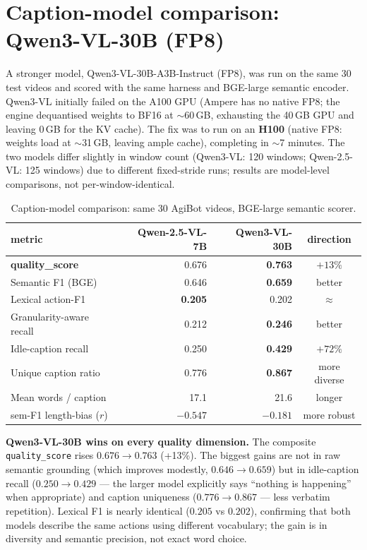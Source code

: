 \documentclass[10pt,letterpaper]{article}
\begin{document}
\section{Caption-model comparison: Qwen3-VL-30B (FP8)}\label{sec:qwen3}

A stronger model, Qwen3-VL-30B-A3B-Instruct (FP8), was run on the same 30 test videos and scored
with the same harness and BGE-large semantic encoder. Qwen3-VL initially failed on the A100 GPU
(Ampere has no native FP8; the engine dequantised weights to BF16 at $\sim$60\,GB, exhausting the
40\,GB GPU and leaving 0\,GB for the KV cache). The fix was to run on an \textbf{H100} (native
FP8: weights load at $\sim$31\,GB, leaving ample cache), completing in $\sim$7 minutes. The
two models differ slightly in window count (Qwen3-VL: 120 windows; Qwen-2.5-VL: 125 windows) due
to different fixed-stride runs; results are model-level comparisons, not per-window-identical.

\begin{table}[H]
\centering
\caption{Caption-model comparison: same 30 AgiBot videos, BGE-large semantic scorer.}
\begin{tabular}{lrr c}
\toprule
metric & Qwen-2.5-VL-7B & Qwen3-VL-30B & direction \\
\midrule
\textbf{quality\_score}       & 0.676 & \textbf{0.763} & $+13\%$ \\
Semantic F1 (BGE)             & 0.646 & \textbf{0.659} & better \\
Lexical action-F1             & \textbf{0.205} & 0.202 & $\approx$ \\
Granularity-aware recall      & 0.212 & \textbf{0.246} & better \\
Idle-caption recall           & 0.250 & \textbf{0.429} & $+72\%$ \\
Unique caption ratio          & 0.776 & \textbf{0.867} & more diverse \\
Mean words / caption          & 17.1 & 21.6 & longer \\
sem-F1 length-bias ($r$)      & $-0.547$ & \textbf{$-0.181$} & more robust \\
\bottomrule
\end{tabular}
\end{table}

\textbf{Qwen3-VL-30B wins on every quality dimension.} The composite \texttt{quality\_score}
rises $0.676 \to 0.763$ (+13\%). The biggest gains are not in raw semantic grounding (which
improves modestly, $0.646 \to 0.659$) but in idle-caption recall ($0.250 \to 0.429$ --- the larger
model explicitly says ``nothing is happening'' when appropriate) and caption uniqueness
($0.776 \to 0.867$ --- less verbatim repetition). Lexical F1 is nearly identical ($0.205$ vs
$0.202$), confirming that both models describe the same actions using different vocabulary; the
gain is in diversity and semantic precision, not exact word choice.
\end{document}
